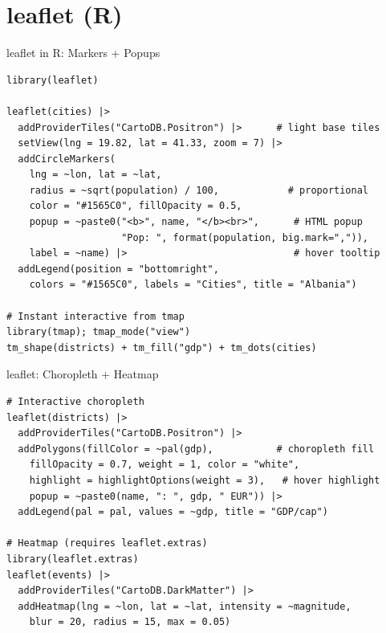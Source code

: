 \documentclass[10pt]{beamer}
\begin{document}
\section{leaflet (R)}
\begin{frame}[fragile]{leaflet in R: Markers + Popups}
\begin{lstlisting}[style=rstyle]
library(leaflet)

leaflet(cities) |>
  addProviderTiles("CartoDB.Positron") |>      # light base tiles
  setView(lng = 19.82, lat = 41.33, zoom = 7) |>
  addCircleMarkers(
    lng = ~lon, lat = ~lat,
    radius = ~sqrt(population) / 100,            # proportional
    color = "#1565C0", fillOpacity = 0.5,
    popup = ~paste0("<b>", name, "</b><br>",      # HTML popup
                    "Pop: ", format(population, big.mark=",")),
    label = ~name) |>                             # hover tooltip
  addLegend(position = "bottomright",
    colors = "#1565C0", labels = "Cities", title = "Albania")

# Instant interactive from tmap
library(tmap); tmap_mode("view")
tm_shape(districts) + tm_fill("gdp") + tm_dots(cities)
\end{lstlisting}
\end{frame}
\begin{frame}[fragile]{leaflet: Choropleth + Heatmap}
\begin{lstlisting}[style=rstyle]
# Interactive choropleth
leaflet(districts) |>
  addProviderTiles("CartoDB.Positron") |>
  addPolygons(fillColor = ~pal(gdp),           # choropleth fill
    fillOpacity = 0.7, weight = 1, color = "white",
    highlight = highlightOptions(weight = 3),   # hover highlight
    popup = ~paste0(name, ": ", gdp, " EUR")) |>
  addLegend(pal = pal, values = ~gdp, title = "GDP/cap")

# Heatmap (requires leaflet.extras)
library(leaflet.extras)
leaflet(events) |>
  addProviderTiles("CartoDB.DarkMatter") |>
  addHeatmap(lng = ~lon, lat = ~lat, intensity = ~magnitude,
    blur = 20, radius = 15, max = 0.05)
\end{lstlisting}
\end{frame}
\end{document}
